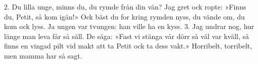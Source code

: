 2.  Du lilla unge, minns du,
    du rymde från din vän?
    Jag gret ock ropte: »Finns du,
    Petit, så kom igän!»
    Ock bäst du for kring rymden nyss,
    du vände om, du kom ock lyss.
    Ja ungen
    var tvungen:
    han ville ha en kyss.
3.  Jag undrar nog, hur länge
    man leva får så säll.
    De säga: »Fast vi stänga
    vår dörr så väl var kväll,
    så finns en vingad pilt vid makt
    att ta Petit ock ta dess vakt.»
    Horribelt,
    torribelt,
    men mamma har så sagt.
